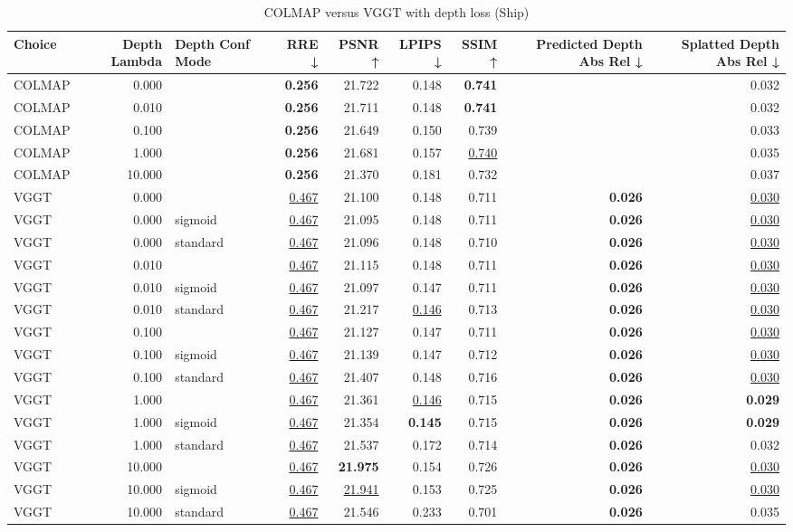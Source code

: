 \begin{table}[H]
\caption{COLMAP versus VGGT with depth loss (Ship)}
\label{tab:05_depth_lambda_ship}
\begin{tabular}{lrlrrrrrr}
\toprule
Choice & Depth Lambda & Depth Conf Mode & RRE ↓ & PSNR ↑ & LPIPS ↓ & SSIM ↑ & Predicted Depth Abs Rel ↓ & Splatted Depth Abs Rel ↓ \\
\midrule
COLMAP & 0.000 &  & \textbf{0.256} & 21.722 & 0.148 & \textbf{0.741} &  & 0.032 \\
COLMAP & 0.010 &  & \textbf{0.256} & 21.711 & 0.148 & \textbf{0.741} &  & 0.032 \\
COLMAP & 0.100 &  & \textbf{0.256} & 21.649 & 0.150 & 0.739 &  & 0.033 \\
COLMAP & 1.000 &  & \textbf{0.256} & 21.681 & 0.157 & \underline{0.740} &  & 0.035 \\
COLMAP & 10.000 &  & \textbf{0.256} & 21.370 & 0.181 & 0.732 &  & 0.037 \\
VGGT & 0.000 &  & \underline{0.467} & 21.100 & 0.148 & 0.711 & \textbf{0.026} & \underline{0.030} \\
VGGT & 0.000 & sigmoid & \underline{0.467} & 21.095 & 0.148 & 0.711 & \textbf{0.026} & \underline{0.030} \\
VGGT & 0.000 & standard & \underline{0.467} & 21.096 & 0.148 & 0.710 & \textbf{0.026} & \underline{0.030} \\
VGGT & 0.010 &  & \underline{0.467} & 21.115 & 0.148 & 0.711 & \textbf{0.026} & \underline{0.030} \\
VGGT & 0.010 & sigmoid & \underline{0.467} & 21.097 & 0.147 & 0.711 & \textbf{0.026} & \underline{0.030} \\
VGGT & 0.010 & standard & \underline{0.467} & 21.217 & \underline{0.146} & 0.713 & \textbf{0.026} & \underline{0.030} \\
VGGT & 0.100 &  & \underline{0.467} & 21.127 & 0.147 & 0.711 & \textbf{0.026} & \underline{0.030} \\
VGGT & 0.100 & sigmoid & \underline{0.467} & 21.139 & 0.147 & 0.712 & \textbf{0.026} & \underline{0.030} \\
VGGT & 0.100 & standard & \underline{0.467} & 21.407 & 0.148 & 0.716 & \textbf{0.026} & \underline{0.030} \\
VGGT & 1.000 &  & \underline{0.467} & 21.361 & \underline{0.146} & 0.715 & \textbf{0.026} & \textbf{0.029} \\
VGGT & 1.000 & sigmoid & \underline{0.467} & 21.354 & \textbf{0.145} & 0.715 & \textbf{0.026} & \textbf{0.029} \\
VGGT & 1.000 & standard & \underline{0.467} & 21.537 & 0.172 & 0.714 & \textbf{0.026} & 0.032 \\
VGGT & 10.000 &  & \underline{0.467} & \textbf{21.975} & 0.154 & 0.726 & \textbf{0.026} & \underline{0.030} \\
VGGT & 10.000 & sigmoid & \underline{0.467} & \underline{21.941} & 0.153 & 0.725 & \textbf{0.026} & \underline{0.030} \\
VGGT & 10.000 & standard & \underline{0.467} & 21.546 & 0.233 & 0.701 & \textbf{0.026} & 0.035 \\
\bottomrule
\end{tabular}
\end{table}
